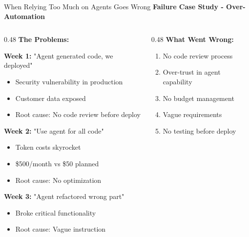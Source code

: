 \documentclass[aspectratio=169,11pt]{beamer}
\begin{document}
\begin{frame}{When Relying Too Much on Agents Goes Wrong}
    \textbf{Failure Case Study - Over-Automation}

    \begin{columns}[T]
        \begin{column}{0.48\textwidth}
            \textbf{The Problems:}

            \textbf{Week 1:} "Agent generated code, we deployed"
            \begin{itemize}
                \item[\textcolor{UofSCRose}{\texttimes}] Security vulnerability in production
                \item[\textcolor{UofSCRose}{\texttimes}] Customer data exposed
                \item Root cause: No code review before deploy
            \end{itemize}

            \textbf{Week 2:} "Use agent for all code"
            \begin{itemize}
                \item[\textcolor{UofSCRose}{\texttimes}] Token costs skyrocket
                \item[\textcolor{UofSCRose}{\texttimes}] \$500/month vs \$50 planned
                \item Root cause: No optimization
            \end{itemize}

            \textbf{Week 3:} "Agent refactored wrong part"
            \begin{itemize}
                \item[\textcolor{UofSCRose}{\texttimes}] Broke critical functionality
                \item Root cause: Vague instruction
            \end{itemize}
        \end{column}
        \begin{column}{0.48\textwidth}
            \textbf{What Went Wrong:}
            \begin{enumerate}
                \item No code review process
                \item Over-trust in agent capability
                \item No budget management
                \item Vague requirements
                \item No testing before deploy
            \end{enumerate}


\end{column}
\end{columns}
\end{frame}
\end{document}
